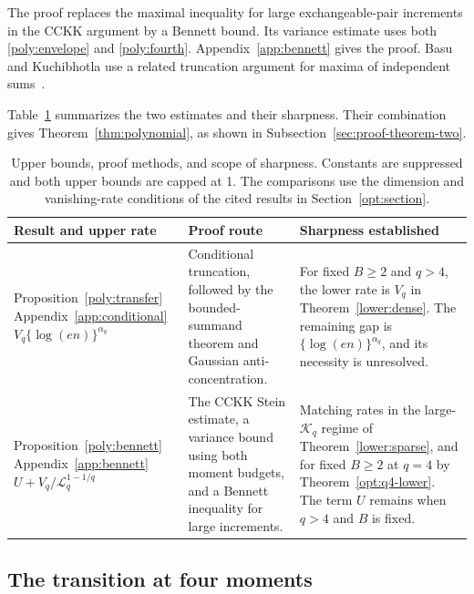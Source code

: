 \documentclass[11pt,letterpaper]{article}
\theoremstyle{remark}
\begin{document}
The proof replaces the maximal inequality for large exchangeable-pair
increments in the CCKK argument by a Bennett bound. Its variance estimate
uses both \eqref{poly:envelope} and \eqref{poly:fourth}.
Appendix~\ref{app:bennett} gives the proof.
Basu and Kuchibhotla use a related truncation
argument for maxima of independent sums~\cite[Proposition~4.2]{BK2025}.

Table~\ref{poly:summary} summarizes the two estimates and their
sharpness. Their combination gives Theorem~\ref{thm:polynomial},
as shown in Subsection~\ref{sec:proof-theorem-two}.

\begin{table}[htbp]
\centering
\small
\renewcommand{\arraystretch}{1.15}
\begin{tabularx}{\textwidth}{@{}>{\raggedright\arraybackslash}p{}
 >{\raggedright\arraybackslash}p{}
 >{\raggedright\arraybackslash}X@{}}
\toprule
Result and upper rate & Proof route & Sharpness established\\
\midrule
Proposition~\ref{poly:transfer}\newline
Appendix~\ref{app:conditional}\newline
\(V_q\{\log(en)\}^{\alpha_q}\)
& Conditional truncation, followed by the bounded-summand theorem and
Gaussian anti-concentration.
& For fixed \(B\ge2\) and \(q>4\), the lower rate is \(V_q\) in
Theorem~\ref{lower:dense}. The remaining gap is
\(\{\log(en)\}^{\alpha_q}\), and its necessity is unresolved.\\[0.6em]
Proposition~\ref{poly:bennett}\newline
Appendix~\ref{app:bennett}\newline
\(U+V_q/\mathcal{L}_q^{1-1/q}\)
& The CCKK Stein estimate, a variance bound using both moment budgets,
and a Bennett inequality for large increments.
& Matching rates in the large-\(\mathcal K_q\) regime of
Theorem~\ref{lower:sparse}, and for fixed \(B\ge2\) at \(q=4\)
by Theorem~\ref{opt:q4-lower}. The term \(U\) remains when \(q>4\)
and \(B\) is fixed.\\
\bottomrule
\end{tabularx}
\caption{Upper bounds, proof methods, and scope of sharpness.
Constants are suppressed and both upper bounds are capped at 1.
The comparisons use the dimension and vanishing-rate conditions of
the cited results in Section~\ref{opt:section}.}
\label{poly:summary}
\end{table}

\subsection{The transition at four moments}\label{poly:transition}
\end{document}
